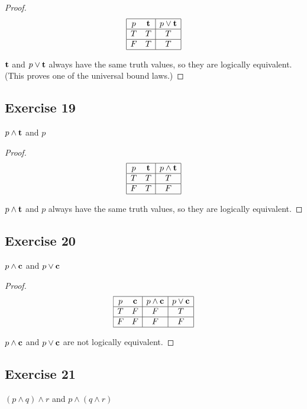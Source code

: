 \documentclass[14pt]{extarticle}
\newcommand{\true}{{\bf t}}
\newcommand{\false}{{\bf c}}
\begin{document}
\begin{proof}
$$
\begin{array}{|cc|c|}
\hline
p & \true & p \vee \true \\
\hline
T & T & T \\
\hline
F & T & T \\
\hline
\end{array}
$$

$\true$ and $p \vee \true$ always have the same truth values, so they are logically equivalent. (This proves one of the universal bound laws.)

\end{proof}

\subsection{Exercise 19}
$p \wedge \true$ and $p$

\begin{proof}
$$
\begin{array}{|cc|c|}
\hline
p & \true & p \wedge \true \\
\hline
T & T & T \\
\hline
F & T & F \\
\hline
\end{array}
$$

$p \wedge \true$ and $p$ always have the same truth values, so they are logically equivalent.
\end{proof}

\subsection{Exercise 20}
$p \wedge \false$ and $p \vee \false$

\begin{proof}
$$
\begin{array}{|cc|c|c|}
\hline
p & \false & p \wedge \false & p \vee \false \\
\hline
T & F & F & T \\
\hline
F & F & F & F \\
\hline
\end{array} $$

$p \wedge \false$ and $p \vee \false$ are not logically equivalent.
\end{proof}

\subsection{Exercise 21}
$(p \wedge q) \wedge r$ and $p \wedge (q \wedge r)$
\end{document}
